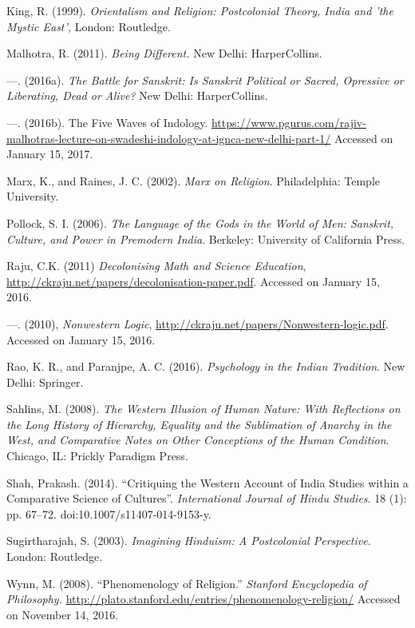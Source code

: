 \begin{thebibliography}{99}
  King, R. (1999). \textit{Orientalism and Religion: Postcolonial Theory, India and 'the Mystic East',} London: Routledge.

  Malhotra, R. (2011). \textit{Being Different.} New Delhi: HarperCollins.

  —. (2016a). \textit{The Battle for Sanskrit: Is Sanskrit Political or Sacred, Opressive or Liberating, Dead or Alive? } New Delhi: HarperCollins.

  —. (2016b). The Five Waves of Indology. \url{https://www.pgurus.com/rajiv-malhotras-lecture-on-swadeshi-indology-at-ignca-new-delhi-part-1/} Accessed on January 15, 2017.

  Marx, K., and Raines, J. C. (2002). \textit{Marx on Religion}. Philadelphia: Temple University.

  Pollock, S. I. (2006). \textit{The Language of the Gods in the World of Men: Sanskrit, Culture, and Power in Premodern India}. Berkeley: University of California Press.

  Raju, C.K. (2011) \textit{Decolonising Math and Science Education}, \url{http://ckraju.net/papers/decolonisation-paper.pdf}. Accessed on January 15, 2016.

  —. (2010), \textit{Nonwestern Logic}, \url{http://ckraju.net/papers/Nonwestern-logic.pdf}. Accessed on January 15, 2016.

  Rao, K. R., and Paranjpe, A. C. (2016). \textit{Psychology in the Indian Tradition}. New Delhi: Springer.

  Sahlins, M. (2008). \textit{The Western Illusion of Human Nature: With Reflections on the Long History of Hierarchy, Equality and the Sublimation of Anarchy in the West, and Comparative Notes on Other Conceptions of the Human Condition}. Chicago, IL: Prickly Paradigm Press.

  Shah, Prakash. (2014). “Critiquing the Western Account of India Studies within a Comparative Science of Cultures”. \textit{International Journal of Hindu Studies}. 18 (1): pp. 67–72. doi:10.1007/s11407-014-9153-y.

  Sugirtharajah, S. (2003). \textit{Imagining Hinduism: A Postcolonial Perspective}. London: Routledge.

  Wynn, M. (2008). “Phenomenology of Religion.” \textit{Stanford Encyclopedia of Philosophy.} \url{http://plato.stanford.edu/entries/phenomenology-religion/} Accessed on November 14, 2016.

 \end{thebibliography}


